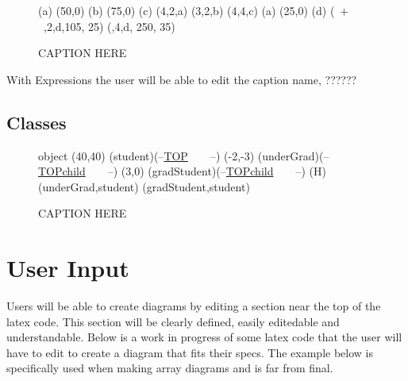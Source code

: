 \documentclass[10pt,a4paper,english]{article}
\begin{document}
\begin{flushleft}
\begin {figure}
\Draw


\MarkLoc(a)
\Move(50,0)
\MarkLoc(b)
\Move(75,0)
\MarkLoc(c)
\boxItDefault(4,2,a)
\boxItDefault(3,2,b)
\boxItDefault(4,4,c)
\MoveToLoc(a)
\Move(25,0)
\MarkLoc(d)
\boxIt(~$  +  $~,2,d,105, 25)
\boxIt(\hspace{135pt}\hfill*\hspace{10pt},4,d, 250, 35)
\EndDraw
\caption {CAPTION HERE }
\label {fig:exprsBoxedAmb1}
\end {figure}

With Expressions the user will be able to edit the caption name, ??????

\subsection*{Classes}

\begin {figure}
\Draw
 {object}
\MinNodeSize(40,40)
\RectNode (student)(--\underline {TOP}~~~~--)
\MoveToExit(-2,-3)
\RectNode (underGrad)(--\underline {TOPchild}~~~~--)
\MoveToExit(3,0)
\RectNode (gradStudent)(--\underline {TOPchild}~~~~--)
\ArrowSpec (H)
\Edge(underGrad,student)
\Edge(gradStudent,student)
\EndDraw
\caption {CAPTION HERE}
\label {fig:studentClasses}
\end {figure}

\section{User Input}
Users will be able to create diagrams by editing a section near the top of the latex code.  This section will be clearly defined, easily editedable and understandable.  Below is a work in progress of some latex code that the user will have to edit to create a diagram that fits their specs. The example below is specifically used when making array diagrams and is far from final.


\end{flushleft}
\end{document}
